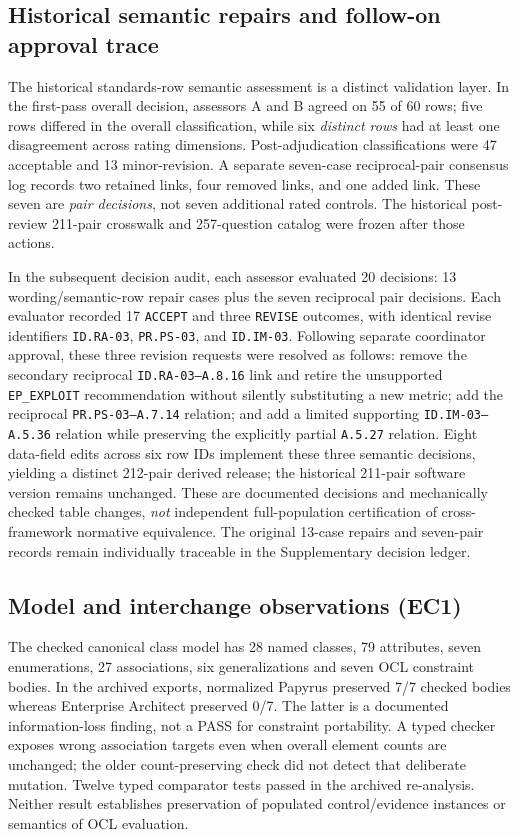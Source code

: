 \documentclass[12pt,a4paper]{article}
\begin{document}
\subsection{Historical semantic repairs and follow-on approval trace}
\label{sec:repairtrace}
The historical standards-row semantic assessment is a distinct validation layer. In the first-pass overall decision, assessors A and B agreed on 55 of 60 rows; five rows differed in the overall classification, while six \emph{distinct rows} had at least one disagreement across rating dimensions. Post-adjudication classifications were 47 acceptable and 13 minor-revision. A separate seven-case reciprocal-pair consensus log records two retained links, four removed links, and one added link. These seven are \emph{pair decisions}, not seven additional rated controls. The historical post-review 211-pair crosswalk and 257-question catalog were frozen after those actions.

In the subsequent decision audit, each assessor evaluated 20 decisions: 13 wording/semantic-row repair cases plus the seven reciprocal pair decisions. Each evaluator recorded 17 \texttt{ACCEPT} and three \texttt{REVISE} outcomes, with identical revise identifiers \texttt{ID.RA-03}, \texttt{PR.PS-03}, and \texttt{ID.IM-03}. Following separate coordinator approval, these three revision requests were resolved as follows: remove the secondary reciprocal \texttt{ID.RA-03--A.8.16} link and retire the unsupported \texttt{EP\_EXPLOIT} recommendation without silently substituting a new metric; add the reciprocal \texttt{PR.PS-03--A.7.14} relation; and add a limited supporting \texttt{ID.IM-03--A.5.36} relation while preserving the explicitly partial \texttt{A.5.27} relation. Eight data-field edits across six row IDs implement these three semantic decisions, yielding a distinct 212-pair derived release; the historical 211-pair software version remains unchanged. These are documented decisions and mechanically checked table changes, \emph{not} independent full-population certification of cross-framework normative equivalence. The original 13-case repairs and seven-pair records remain individually traceable in the Supplementary decision ledger.

\subsection{Model and interchange observations (EC1)}
The checked canonical class model has 28 named classes, 79 attributes, seven enumerations, 27 associations, six generalizations and seven OCL constraint bodies. In the archived exports, normalized Papyrus preserved 7/7 checked bodies whereas Enterprise Architect preserved 0/7. The latter is a documented information-loss finding, not a PASS for constraint portability. A typed checker exposes wrong association targets even when overall element counts are unchanged; the older count-preserving check did not detect that deliberate mutation. Twelve typed comparator tests passed in the archived re-analysis. Neither result establishes preservation of populated control/evidence instances or semantics of OCL evaluation.
\end{document}

